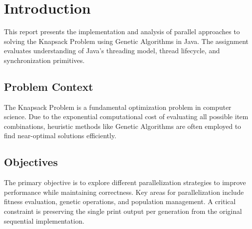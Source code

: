 \chapter{Introduction} \label{cap:intro}

This report presents the implementation and analysis of parallel approaches to solving the Knapsack Problem using Genetic Algorithms in Java. The assignment evaluates understanding of Java's threading model, thread lifecycle, and synchronization primitives.

\section{Problem Context}

The Knapsack Problem is a fundamental optimization problem in computer science. Due to the exponential computational cost of evaluating all possible item combinations, heuristic methods like Genetic Algorithms are often employed to find near-optimal solutions efficiently.

\section{Objectives}

The primary objective is to explore different parallelization strategies to improve performance while maintaining correctness. Key areas for parallelization include fitness evaluation, genetic operations, and population management. A critical constraint is preserving the single print output per generation from the original sequential implementation.